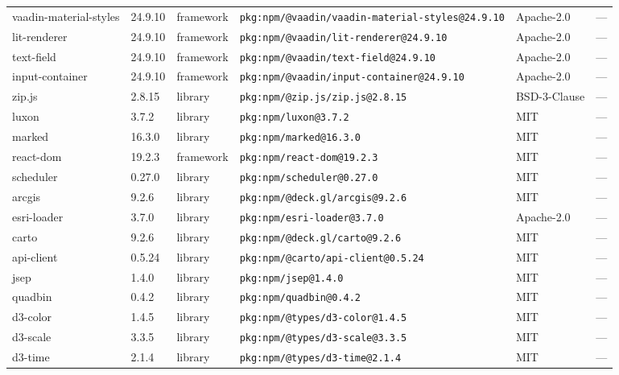 \documentclass[11pt,a4paper]{article}
\begin{document}
\begin{longtable}{|p{4cm}|p{2cm}|p{1.6cm}|p{5cm}|p{1.5cm}|p{3.5cm}|}
\raggedright vaadin-material-styles & 24.9.10 & framework & \small\texttt{pkg:npm/@vaadin/vaadin-material-styles@24.9.10} & Apache-2.0 & \small — \\
\raggedright lit-renderer & 24.9.10 & framework & \small\texttt{pkg:npm/@vaadin/lit-renderer@24.9.10} & Apache-2.0 & \small — \\
\raggedright text-field & 24.9.10 & framework & \small\texttt{pkg:npm/@vaadin/text-field@24.9.10} & Apache-2.0 & \small — \\
\raggedright input-container & 24.9.10 & framework & \small\texttt{pkg:npm/@vaadin/input-container@24.9.10} & Apache-2.0 & \small — \\
\raggedright zip.js & 2.8.15 & library & \small\texttt{pkg:npm/@zip.js/zip.js@2.8.15} & BSD-3-Clause & \small — \\
\raggedright luxon & 3.7.2 & library & \small\texttt{pkg:npm/luxon@3.7.2} & MIT & \small — \\
\raggedright marked & 16.3.0 & library & \small\texttt{pkg:npm/marked@16.3.0} & MIT & \small — \\
\raggedright react-dom & 19.2.3 & framework & \small\texttt{pkg:npm/react-dom@19.2.3} & MIT & \small — \\
\raggedright scheduler & 0.27.0 & library & \small\texttt{pkg:npm/scheduler@0.27.0} & MIT & \small — \\
\raggedright arcgis & 9.2.6 & library & \small\texttt{pkg:npm/@deck.gl/arcgis@9.2.6} & MIT & \small — \\
\raggedright esri-loader & 3.7.0 & library & \small\texttt{pkg:npm/esri-loader@3.7.0} & Apache-2.0 & \small — \\
\raggedright carto & 9.2.6 & library & \small\texttt{pkg:npm/@deck.gl/carto@9.2.6} & MIT & \small — \\
\raggedright api-client & 0.5.24 & library & \small\texttt{pkg:npm/@carto/api-client@0.5.24} & MIT & \small — \\
\raggedright jsep & 1.4.0 & library & \small\texttt{pkg:npm/jsep@1.4.0} & MIT & \small — \\
\raggedright quadbin & 0.4.2 & library & \small\texttt{pkg:npm/quadbin@0.4.2} & MIT & \small — \\
\raggedright d3-color & 1.4.5 & library & \small\texttt{pkg:npm/@types/d3-color@1.4.5} & MIT & \small — \\
\raggedright d3-scale & 3.3.5 & library & \small\texttt{pkg:npm/@types/d3-scale@3.3.5} & MIT & \small — \\
\raggedright d3-time & 2.1.4 & library & \small\texttt{pkg:npm/@types/d3-time@2.1.4} & MIT & \small — \\

\end{longtable}
\end{document}
